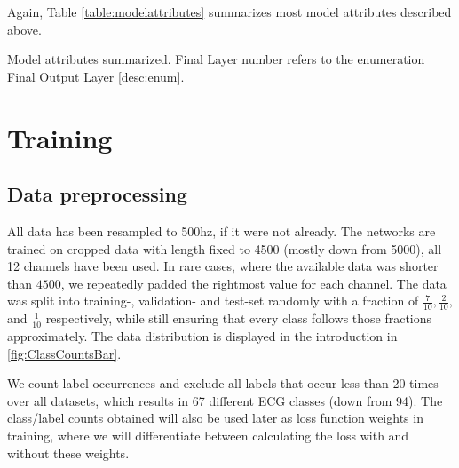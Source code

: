Again, Table \ref{table:modelattributes} summarizes most model attributes described above.

\begin{table}
	\caption{Model attributes summarized. Final Layer number refers to the enumeration \underline{Final Output Layer} \ref{desc:enum}.}
	\label{table:modelattributes}	
\end{table}

\section{Training}

\subsection{Data preprocessing} \label{section:prep}

All data has been resampled to 500hz, if it were not already. The networks are trained on cropped data with length fixed to 4500 (mostly down from 5000), all 12 channels have been used. In rare cases, where the available data was shorter than $4500$, we repeatedly padded the rightmost value for each channel. The data was split into training-, validation- and test-set randomly with a fraction of $\frac{7}{10}, \frac{2}{10},$ and $\frac{1}{10}$ respectively, while still ensuring that every class follows those fractions approximately. The data distribution is displayed in the introduction in \autoref{fig:ClassCountsBar}.

We count label occurrences and exclude all labels that occur less than 20 times over all datasets, which results in 67 different ECG classes (down from 94).
The class/label counts obtained will also be used later as loss function weights in training, where we will differentiate between calculating the loss with and without these weights.

